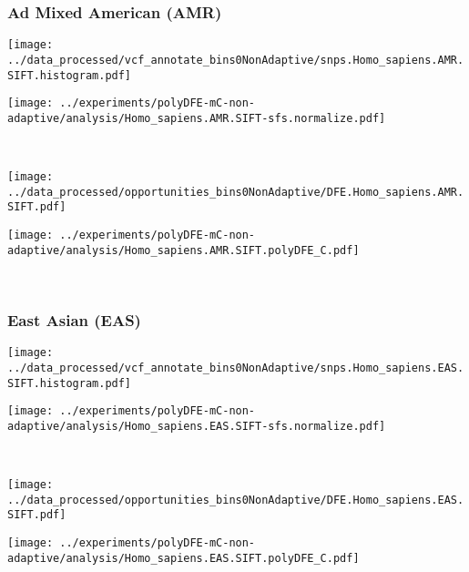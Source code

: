 \subsubsection{Ad Mixed American (AMR)}

\begin{minipage}{0.49\linewidth}
    \texttt{[image: ../data\_processed/vcf\_annotate\_bins0NonAdaptive/snps.Homo\_sapiens.AMR.SIFT.histogram.pdf]}
\end{minipage}
\begin{minipage}{0.49\linewidth}
    \texttt{[image: ../experiments/polyDFE-mC-non-adaptive/analysis/Homo\_sapiens.AMR.SIFT-sfs.normalize.pdf]}
\end{minipage}
\\
\begin{minipage}{0.49\linewidth}
    \texttt{[image: ../data\_processed/opportunities\_bins0NonAdaptive/DFE.Homo\_sapiens.AMR.SIFT.pdf]}
\end{minipage}
\begin{minipage}{0.49\linewidth}
    \texttt{[image: ../experiments/polyDFE-mC-non-adaptive/analysis/Homo\_sapiens.AMR.SIFT.polyDFE\_C.pdf]}
\end{minipage}
\\

\subsubsection{East Asian (EAS)}

\begin{minipage}{0.49\linewidth}
    \texttt{[image: ../data\_processed/vcf\_annotate\_bins0NonAdaptive/snps.Homo\_sapiens.EAS.SIFT.histogram.pdf]}
\end{minipage}
\begin{minipage}{0.49\linewidth}
    \texttt{[image: ../experiments/polyDFE-mC-non-adaptive/analysis/Homo\_sapiens.EAS.SIFT-sfs.normalize.pdf]}
\end{minipage}
\\
\begin{minipage}{0.49\linewidth}
    \texttt{[image: ../data\_processed/opportunities\_bins0NonAdaptive/DFE.Homo\_sapiens.EAS.SIFT.pdf]}
\end{minipage}
\begin{minipage}{0.49\linewidth}
    \texttt{[image: ../experiments/polyDFE-mC-non-adaptive/analysis/Homo\_sapiens.EAS.SIFT.polyDFE\_C.pdf]}
\end{minipage}
\\

